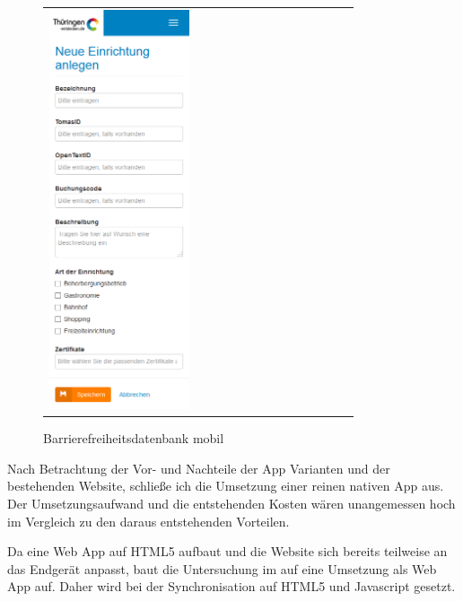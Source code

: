 \begin{figure}[htb]
\begin{tabular}{l r}
		\includegraphics[width=0.49\textwidth]{Bilder/Datenerfassung-mobil}
	\end{tabular}
	\caption{Barrierefreiheitsdatenbank mobil}
	\label{Websitemobil}
\end{figure}

\cleardoublepage

Nach Betrachtung der Vor- und Nachteile der App Varianten und der bestehenden Website, schließe ich die Umsetzung einer reinen nativen App aus. Der Umsetzungsaufwand und die entstehenden Kosten wären unangemessen hoch im Vergleich zu den daraus entstehenden Vorteilen.

Da eine Web App auf \ac{HTML5} aufbaut und die Website sich bereits teilweise an das Endgerät anpasst, baut die Untersuchung im auf eine Umsetzung als Web App auf. Daher wird bei der Synchronisation auf \ac{HTML5} und Javascript gesetzt.